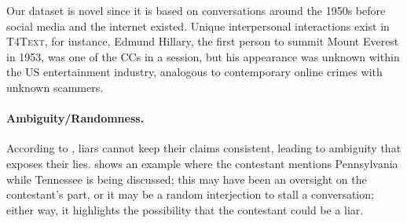 Our dataset is novel since it is based on conversations around the 1950s before social media and the internet existed. Unique interpersonal interactions exist in \textsc{T4Text}, for instance, Edmund Hillary, the first person to summit Mount Everest in 1953, was one of the CCs in a session, but his appearance was unknown within the US entertainment industry, analogous to contemporary online crimes with unknown scammers.


\paragraph{Ambiguity/Randomness.}
According to \citet{ekman1997deception}, liars cannot keep their claims consistent, leading to ambiguity that exposes their lies.  shows an example where the contestant mentions Pennsylvania while Tennessee is being discussed; this may have been an oversight on the contestant's part, or it may be a random interjection to stall a conversation; either way, it highlights the possibility that the contestant could be a liar. 

